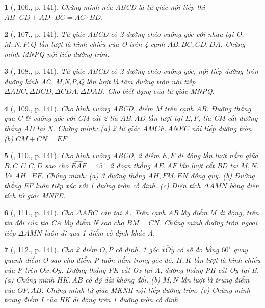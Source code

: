 \documentclass{article}
\newtheorem{baitoan}{}
\begin{document}
\begin{baitoan}[\cite{Tuyen_Toan_9_old}, 106., p. 141]
	Chứng minh nếu ABCD là tứ giác nội tiếp thì $AB\cdot CD + AD\cdot BC = AC\cdot BD$.
\end{baitoan}

\begin{baitoan}[\cite{Tuyen_Toan_9_old}, 107., p. 141]
	Tứ giác ABCD có 2 đường chéo vuông góc với nhau tại O. $M,N,P,Q$ lần lượt là hình chiếu của O trên 4 cạnh $AB,BC,CD,DA$. Chứng minh MNPQ nội tiếp đường tròn.
\end{baitoan}

\begin{baitoan}[\cite{Tuyen_Toan_9_old}, 108., p. 141]
	Tứ giác ABCD có 2 đường chéo vuông góc, nội tiếp đường tròn đường kính AC. M,N,P,Q lần lượt là tâm đường tròn nội tiếp $\Delta ABC,\Delta BCD,\Delta CDA,\Delta DAB$. Cho biết dạng của tứ giác MNPQ.
\end{baitoan}

\begin{baitoan}[\cite{Tuyen_Toan_9_old}, 109., p. 141]
	Cho hình vuông ABCD, điểm M trên cạnh AB. Đường thẳng qua C \& vuông góc với CM cắt 2 tia $AB,AD$ lần lượt tại $E,F$, tia CM cắt đường thẳng AD tại N. Chứng minh: (a) 2 tứ giác $AMCF,ANEC$ nội tiếp đường tròn. (b) $CM + CN = EF$.
\end{baitoan}

\begin{baitoan}[\cite{Tuyen_Toan_9_old}, 110., p. 141]
	Cho hình vuông ABCD, 2 điểm $E,F$ di động lần lượt nằm giữa $B,C$ \& $C,D$ sao cho $\widehat{EAF} = 45^\circ$. 2 đoạn thẳng $AE,AF$ lần lượt cắt BD tại $M,N$. Vẽ $AH\bot EF$. Chứng minh: (a) 3 đường thẳng $AH,FM,EN$ đồng quy. (b) Đường thẳng EF luôn tiếp xúc với 1 đường tròn cố định. (c) Diện tích $\Delta AMN$ bàng diện tích tứ giác MNFE.
\end{baitoan}

\begin{baitoan}[\cite{Tuyen_Toan_9_old}, 111., p. 141]
	Cho $\Delta ABC$ cân tại A. Trên cạnh AB lấy điểm M di động, trên tia đối của tia CA lấy điểm N sao cho $BM = CN$. Chứng minh đường tròn ngoại tiếp $\Delta AMN$ luôn đi qua 1 điểm cố định khác A.
\end{baitoan}

\begin{baitoan}[\cite{Tuyen_Toan_9_old}, 112., p. 141]
	Cho 2 điểm $O,P$ cố định. 1 góc $\widehat{xOy}$ có số đo bằng $60^\circ$ quay quanh điểm O sao cho điểm P luôn nằm trong góc đó. $H,K$ lần lượt là hình chiếu của P trên $Ox,Oy$. Đường thẳng PK cắt Ox tại A, đường thẳng PH cắt Oy tại B. (a) Chứng minh $HK,AB$ có độ dài không đổi. (b) $M,N$ lần lượt là trung điểm của $OP,AB$. Chứng minh tứ giác MKNH nội tiếp đường tròn. (c) Chứng minh trung điểm I của HK di động trên 1 đường tròn cố định.
\end{baitoan}
\end{document}
